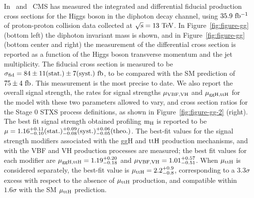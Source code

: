 \documentclass[10pt]{article}
\begin{document}
In~\cite{CMS:HIG-17-015} and~\cite{CMS:HIG-16-040} CMS has measured the integrated
and differential fiducial
production cross sections for the Higgs boson in the diphoton decay channel, using
${\rm 35.9~fb^{-1}}$ of proton-proton collision data collected at
${\rm \sqrt{s} = 13~TeV}$. In Figure~\ref{fig:figure-gg} (bottom left) the diphoton
invariant mass is shown, and in Figure~\ref{fig:figure-gg} (bottom center and right) the measurement of the differential cross section is reported as a function
of the Higgs boson transverse momentum and the jet multiplicity. The fiducial cross
section is measured to be ${\rm \sigma_{fid} = 84\pm 11(stat.)\pm 7(syst.)~fb}$, to
be compared with the SM prediction of ${\rm 75 \pm 4~fb}$. This measurement is the
most precise to date. We also report the overall signal strength, the rates for
signal strengths ${\rm \mu_{VBF,VH}}$ and ${\rm \mu_{ggH,ttH}}$ for the model with
these two parameters allowed to vary, and cross section ratios for the Stage 0 STXS
process definitions, as shown in Figure~\ref{fig:figure-gg-2} (right). The best fit
signal strength obtained profiling ${\rm m_H}$ is reported to be
${\rm \mu = 1.16_{-0.10}^{+0.11}(stat.)_{-0.08}^{+0.09}(syst.)_{-0.05}^{+0.06}(theo.)}$.
The best-fit values for the signal strength modifiers associated with the ggH and
${\rm ttH}$ production mechanisms, and with the VBF and VH production processes
are measured; the best fit values for each modifier are
${\rm \mu_{ggH,ttH} = 1.19_{-0.18}^{+0.20}}$ and
${\rm \mu_{VBF,VH} = 1.01_{-0.51}^{+0.57}}$. When ${\rm \mu_{ttH}}$ is considered
separately, the best-fit value is ${\rm \mu_{ttH} = 2.2_{-0.8}^{+0.9}}$, corresponding
to a $3.3\sigma$ excess with respect to the absence of ${\rm \mu_{ttH}}$ production,
and compatible within $1.6\sigma$ with the SM ${\rm \mu_{ttH}}$ prediction.
\end{document}
